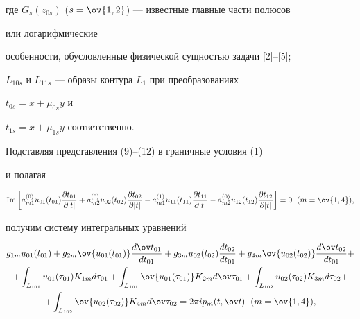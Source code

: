 где $G_s(z_{0s})$ ($s=\ov{1,2}$) --- известные главные части полюсов 


или логарифмические 


особенности, обусловленные физической сущностью задачи [2]--[5]; 


$L_{10s}$ и $L_{11s}$ --- образы контура $L_1$ при преобразованиях 


$t_{0s}=x+\mu_{0s}y$ и 


$t_{1s}=x+\mu_{1s}y$ соответственно. 


Подставляя представления (9)--(12) в граничные условия (1) 


и полагая 


\begin{equation} 


\im\bigg[a^{(0)}_{m1}u_{01}(t_{01}) 


\frac{\partial t_{01}}{\partial|t|}+a^{(0)}_{m2}u_{02}(t_{02}) 


\frac{\partial t_{02}}{\partial|t|}- 


a^{(1)}_{m1}u_{11}(t_{11}) 


\frac{\partial t_{11}}{\partial|t|}- 


a^{(0)}_{m2}u_{12}(t_{12})


\frac{\partial t_{12}}{\partial|t|}\bigg]=0 


\ \; (m=\ov{1,4}), 


\end{equation} 


получим систему интегральных уравнений 


\begin{multline} 


g_{1m}u_{01}(t_{01})+g_{2m}\ov{u_{01}(t_{01})} 


\frac{d\ov t_{01}}{d t_{01}}+g_{3m}u_{02}(t_{02}) 


\frac{d t_{02}}{d t_{01}}+g_{4m}\ov{u_{02}(t_{02})} 


\frac{d\ov t_{02}}{d t_{01}}+ \\ 


% 


+\int_{L_{101}}u_{01}(\tau_{01})K_{1m}d\tau_{01}+ 


\int_{L_{101}}\ov{u_{01}(\tau_{01})}K_{2m}d\ov\tau_{01}+ 


\int_{L_{102}}u_{02}(\tau_{02})K_{3m}d\tau_{02}+ \\


%


+\int_{L_{102}}\ov{u_{02}(\tau_{02})}K_{4m}d\ov\tau_{02}= 


2\pi i p_m(t,\ov t)\ \; (m=\ov{1,4}), 


\end{multline} 


